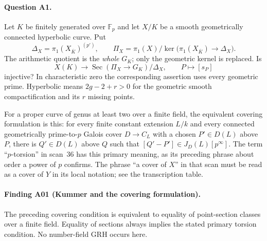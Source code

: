 \documentclass[11pt,a4paper]{article}
\begin{document}
\paragraph{Question A1.}
Let $K$ be finitely generated over $\mathbb F_p$ and let $X/K$ be a smooth
geometrically connected hyperbolic curve. Put
\[
 \Delta_X=\pi_1(X_{\overline K})^{(p')},\qquad
 \Pi_X=\pi_1(X)/\ker\bigl(\pi_1(X_{\overline K})\to\Delta_X\bigr).
\]
The arithmetic quotient is the \emph{whole} $G_K$; only the geometric
kernel is replaced. Is
\[
 X(K)\longrightarrow
 \operatorname{Sec}(\Pi_X\to G_K)/\Delta_X,
 \qquad P\longmapsto[s_P]
 \tag{A1}
\]
injective? In characteristic zero the corresponding assertion uses every
geometric prime. Hyperbolic means $2g-2+r>0$ for the geometric smooth
compactification and its $r$ missing points.

For a proper curve of genus at least two over a finite field, the equivalent
covering formulation is this: for every finite constant extension $L/k$
and every connected geometrically prime-to-$p$ Galois cover $D\to C_L$
with a chosen $P'\in D(L)$ above $P$, there is $Q'\in D(L)$ above $Q$
such that $[Q'-P']\in J_D(L)[p^\infty]$. The term ``$p$-torsion'' in
scan~36 has this primary meaning, as its preceding phrase about order a
power of $p$ confirms. The phrase ``a cover of $X$'' in that scan must be
read as a cover of $Y$ in its local notation; see the transcription table.

\paragraph{Finding A01 (Kummer and the covering formulation).}
The preceding covering condition is equivalent to equality of point-section
classes over a finite field. Equality of sections always implies the
stated primary torsion condition. No number-field GRH occurs here.
\end{document}
